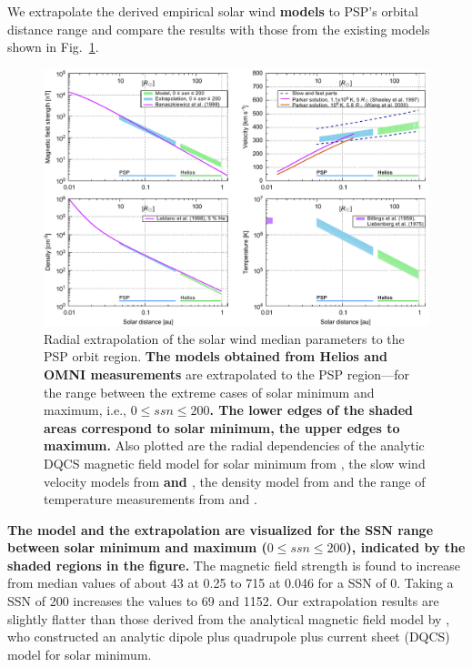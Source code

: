 We extrapolate the derived empirical solar wind \textbf{models} to PSP’s orbital distance range and compare the results with those from the existing models shown in Fig.~\ref{fig:sw_extrapolation_ssn_e_plot}.
\begin{figure}
	\includegraphics[width=18cm]{figures/sw_extrapolation_ssn_e_plot.pdf}
	\caption{Radial extrapolation of the solar wind median parameters to the PSP orbit region. \textbf{The models obtained from Helios and OMNI measurements} are extrapolated to the PSP region---for the range between the extreme cases of solar minimum and maximum, i.e., $0 \le ssn \le 200$\textbf{. The lower edges of the shaded areas correspond to solar minimum, the upper edges to maximum.} Also plotted are the radial dependencies of the analytic DQCS magnetic field model for solar minimum from \citet{Banaszkiewicz1998}, the slow wind velocity models from \textbf{\citet{Sheeley1997} and \citet{Wang2000}}, the density model from \citet{Leblanc1998} and the range of temperature measurements from \citet{Billings1959} and \citet{Liebenberg1975}.}
	\label{fig:sw_extrapolation_ssn_e_plot}
\end{figure}
\textbf{The model and the extrapolation are visualized for the SSN range between solar minimum and maximum ($0 \le ssn \le 200$), indicated by the shaded regions in the figure.}
The magnetic field strength is found to increase from median values of about \SI{43}{\nT} at \SI{0.25}{\au} to \SI{715}{\nT} at \SI{0.046}{\au} for a SSN of 0. Taking a SSN of 200 increases the values to \SI{69}{\nT} and \SI{1152}{\nT}. Our extrapolation results are slightly flatter than those derived from the analytical magnetic field model by \citet{Banaszkiewicz1998}, who constructed an analytic dipole plus quadrupole plus current sheet (DQCS) model for solar minimum.
